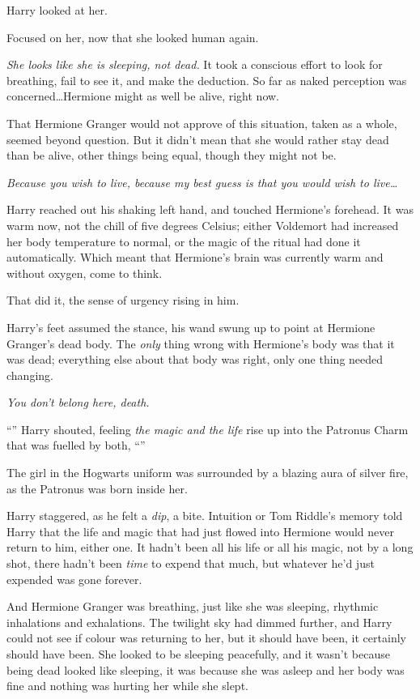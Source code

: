 Harry looked at her.

Focused on her, now that she looked human again.

\emph{She looks like she is sleeping, not dead.} It took a conscious effort to look for breathing, fail to see it, and make the deduction. So far as naked perception was concerned…Hermione might as well be alive, right now.

That Hermione Granger would not approve of this situation, taken as a whole, seemed beyond question. But it didn’t mean that she would rather stay dead than be alive, other things being equal, though they might not be.

\emph{Because you wish to live, because my best guess is that you would wish to live…}

Harry reached out his shaking left hand, and touched Hermione’s forehead. It was warm now, not the chill of five degrees Celsius; either Voldemort had increased her body temperature to normal, or the magic of the ritual had done it automatically. Which meant that Hermione’s brain was currently warm and without oxygen, come to think.

That did it, the sense of urgency rising in him.

Harry’s feet assumed the stance, his wand swung up to point at Hermione Granger’s dead body. The \emph{only} thing wrong with Hermione’s body was that it was dead; everything else about that body was right, only one thing needed changing.

\emph{You don’t belong here, death.}

“” Harry shouted, feeling \emph{the magic and the life} rise up into the Patronus Charm that was fuelled by both, “”

The girl in the Hogwarts uniform was surrounded by a blazing aura of silver fire, as the Patronus was born inside her.

Harry staggered, as he felt a \emph{dip}, a bite. Intuition or Tom Riddle’s memory told Harry that the life and magic that had just flowed into Hermione would never return to him, either one. It hadn’t been all his life or all his magic, not by a long shot, there hadn’t been \emph{time} to expend that much, but whatever he’d just expended was gone forever.

And Hermione Granger was breathing, just like she was sleeping, rhythmic inhalations and exhalations. The twilight sky had dimmed further, and Harry could not see if colour was returning to her, but it should have been, it certainly should have been. She looked to be sleeping peacefully, and it wasn’t because being dead looked like sleeping, it was because she was asleep and her body was fine and nothing was hurting her while she slept.


